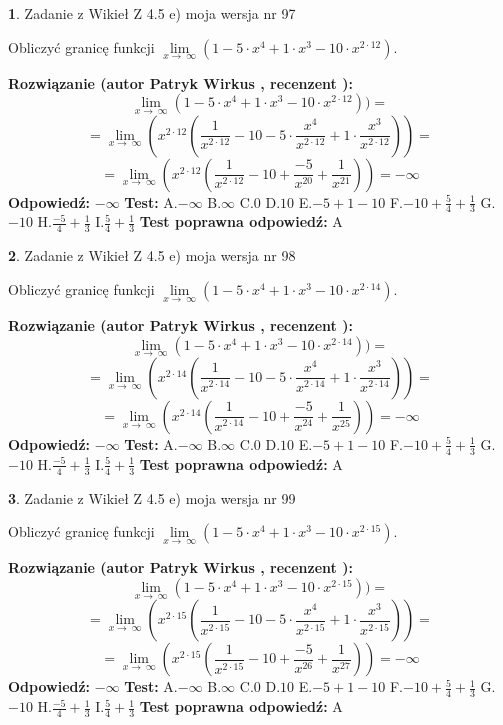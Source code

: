 \documentclass[12pt, a4paper]{article}
\theoremstyle{definition} %
\newtheorem{zad}{}
\newcommand{\zadStart}[1]{\begin{zad}#1\newline}
\newcommand{\zadStop}{\end{zad}}
\newcommand{\rozwStart}[2]{\noindent \textbf{Rozwiązanie (autor #1 , recenzent #2): }\newline}
\newcommand{\rozwStop}{\newline}
\newcommand{\odpStart}{\noindent \textbf{Odpowiedź:}\newline}
\newcommand{\odpStop}{\newline}
\newcommand{\testStart}{\noindent \textbf{Test:}\newline}
\newcommand{\testStop}{\newline}
\newcommand{\kluczStart}{\noindent \textbf{Test poprawna odpowiedź:}\newline}
\newcommand{\kluczStop}{\newline}
\begin{document}
\zadStart{Zadanie z Wikieł Z 4.5 e) moja wersja nr 97}



Obliczyć granicę funkcji  $\lim\limits_{x\to\ \infty}(1 - 5 \cdot x^{4}+1 \cdot x^{3}- 10 \cdot x^{2\cdot12})$.
\zadStop
\rozwStart{Patryk Wirkus}{}
$$\lim\limits_{x\to\ \infty}(1 - 5 \cdot x^{4}+1 \cdot x^{3}- 10 \cdot x^{2\cdot12}))=$$
$$=\lim\limits_{x\to\ \infty}(x^{2\cdot12}(\frac{1}{x^{2\cdot12}}-10 -5 \cdot \frac{x^{4}}{x^{2\cdot12}}+1 \cdot \frac{x^{3}}{x^{2\cdot12}}))=$$
$$=\lim\limits_{x\to\ \infty}(x^{2\cdot12}(\frac{1}{x^{2\cdot12}}-10 + \frac{-5}{x^{20}}+ \frac{1}{x^{21}}))=-\infty$$
\rozwStop
\odpStart
$-\infty$
\odpStop
\testStart
A.$-\infty$ B.$\infty$ C.$0$ D.$10$ E.$-5 + 1 - 10$
F.$-10+\frac{5}{4}+\frac{1}{3}$ G.$-10$
H.$\frac{-5}{4}+\frac{1}{3}$
I.$\frac{5}{4}+\frac{1}{3}$
\testStop
\kluczStart
A
\kluczStop



\zadStart{Zadanie z Wikieł Z 4.5 e) moja wersja nr 98}



Obliczyć granicę funkcji  $\lim\limits_{x\to\ \infty}(1 - 5 \cdot x^{4}+1 \cdot x^{3}- 10 \cdot x^{2\cdot14})$.
\zadStop
\rozwStart{Patryk Wirkus}{}
$$\lim\limits_{x\to\ \infty}(1 - 5 \cdot x^{4}+1 \cdot x^{3}- 10 \cdot x^{2\cdot14}))=$$
$$=\lim\limits_{x\to\ \infty}(x^{2\cdot14}(\frac{1}{x^{2\cdot14}}-10 -5 \cdot \frac{x^{4}}{x^{2\cdot14}}+1 \cdot \frac{x^{3}}{x^{2\cdot14}}))=$$
$$=\lim\limits_{x\to\ \infty}(x^{2\cdot14}(\frac{1}{x^{2\cdot14}}-10 + \frac{-5}{x^{24}}+ \frac{1}{x^{25}}))=-\infty$$
\rozwStop
\odpStart
$-\infty$
\odpStop
\testStart
A.$-\infty$ B.$\infty$ C.$0$ D.$10$ E.$-5 + 1 - 10$
F.$-10+\frac{5}{4}+\frac{1}{3}$ G.$-10$
H.$\frac{-5}{4}+\frac{1}{3}$
I.$\frac{5}{4}+\frac{1}{3}$
\testStop
\kluczStart
A
\kluczStop



\zadStart{Zadanie z Wikieł Z 4.5 e) moja wersja nr 99}



Obliczyć granicę funkcji  $\lim\limits_{x\to\ \infty}(1 - 5 \cdot x^{4}+1 \cdot x^{3}- 10 \cdot x^{2\cdot15})$.
\zadStop
\rozwStart{Patryk Wirkus}{}
$$\lim\limits_{x\to\ \infty}(1 - 5 \cdot x^{4}+1 \cdot x^{3}- 10 \cdot x^{2\cdot15}))=$$
$$=\lim\limits_{x\to\ \infty}(x^{2\cdot15}(\frac{1}{x^{2\cdot15}}-10 -5 \cdot \frac{x^{4}}{x^{2\cdot15}}+1 \cdot \frac{x^{3}}{x^{2\cdot15}}))=$$
$$=\lim\limits_{x\to\ \infty}(x^{2\cdot15}(\frac{1}{x^{2\cdot15}}-10 + \frac{-5}{x^{26}}+ \frac{1}{x^{27}}))=-\infty$$
\rozwStop
\odpStart
$-\infty$
\odpStop
\testStart
A.$-\infty$ B.$\infty$ C.$0$ D.$10$ E.$-5 + 1 - 10$
F.$-10+\frac{5}{4}+\frac{1}{3}$ G.$-10$
H.$\frac{-5}{4}+\frac{1}{3}$
I.$\frac{5}{4}+\frac{1}{3}$
\testStop
\kluczStart
A
\kluczStop
\end{document}
